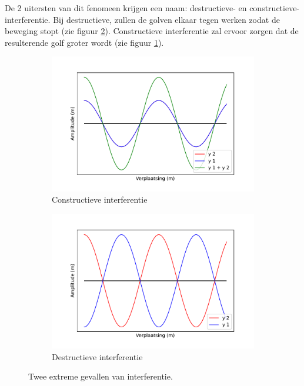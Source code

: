 \documentclass[a4paper,kul]{kulakarticle} %
\begin{document}
De 2 uitersten van dit fenomeen krijgen een naam: destructieve- en constructieve-interferentie. Bij destructieve, zullen de golven elkaar tegen werken zodat de beweging stopt (zie figuur \ref{fig:destructief}). Constructieve interferentie zal ervoor zorgen dat de resulterende golf groter wordt (zie figuur \ref{fig:constructief}).
\begin{figure}[h]
	\centering
	\begin{subfigure}{.5\textwidth}
		\centering
		\includegraphics[width=1\linewidth]{constructieve_interferentie}
		\caption{Constructieve interferentie}
		\label{fig:constructief}
	\end{subfigure}%
	\begin{subfigure}{.5\textwidth}
		\centering
		\includegraphics[width=1\linewidth]{destructieve_interferentie}
		\caption{Destructieve interferentie}
		\label{fig:destructief}
	\end{subfigure}
	\caption{Twee extreme gevallen van interferentie.}
	\label{fig:omegaVZ}
\end{figure}\\
\end{document}
